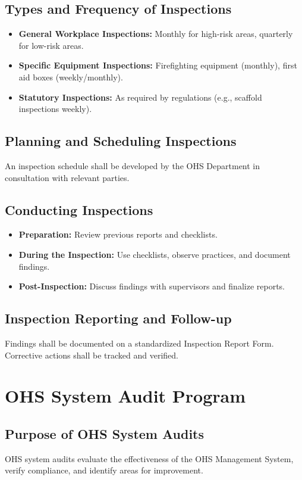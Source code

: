 \documentclass[12pt]{article}
\begin{document}
\subsection{Types and Frequency of Inspections}
\begin{itemize}
    \item \textbf{General Workplace Inspections:} Monthly for high-risk areas, quarterly for low-risk areas.
    \item \textbf{Specific Equipment Inspections:} Firefighting equipment (monthly), first aid boxes (weekly/monthly).
    \item \textbf{Statutory Inspections:} As required by regulations (e.g., scaffold inspections weekly).
\end{itemize}

\subsection{Planning and Scheduling Inspections}
An inspection schedule shall be developed by the OHS Department in consultation with relevant parties.

\subsection{Conducting Inspections}
\begin{itemize}
    \item \textbf{Preparation:} Review previous reports and checklists.
    \item \textbf{During the Inspection:} Use checklists, observe practices, and document findings.
    \item \textbf{Post-Inspection:} Discuss findings with supervisors and finalize reports.
\end{itemize}

\subsection{Inspection Reporting and Follow-up}
Findings shall be documented on a standardized Inspection Report Form. Corrective actions shall be tracked and verified.

\section{OHS System Audit Program}

\subsection{Purpose of OHS System Audits}
OHS system audits evaluate the effectiveness of the OHS Management System, verify compliance, and identify areas for improvement.
\end{document}
